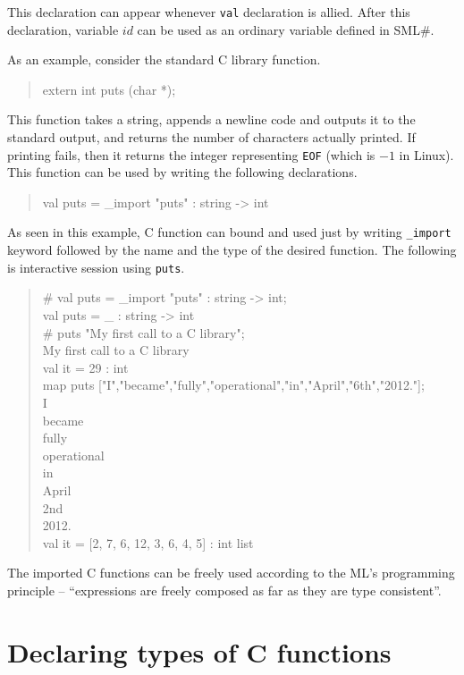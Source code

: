 \documentclass{jbook}
\newcommand{\txt}[2]{#2}
\newcommand{\smlsharp}{SML\#}
\newenvironment{program}{\begin{tt}\begin{quote}}{\end{quote}\end{tt}}
\begin{document}
	This declaration can appear whenever {\tt val} declaration is
allied.
	After this declaration, variable $id$ can be used as an ordinary
variable defined in \smlsharp{}.

	As an example, consider the standard C library function.
\begin{program}
extern int puts (char *);
\end{program}
	This function takes a string, appends a newline code and outputs
it to the standard output, and returns the number of characters actually
printed.
	If printing fails, then it returns the integer representing
{\tt EOF} (which is $-1$ in Linux).
	This function can be used by writing the following declarations.
\begin{program}
val puts = \_import "puts" : string -> int
\end{program}
	As seen in this example, C function can bound and used just by
writing {\tt \_import} keyword followed by the name and the type of the
desired function.
	The following is interactive session using {\tt puts}.
\begin{program}
\# val puts = \_import "puts" : string -> int;\\
val puts = \_ : string -> int\\
\# puts "My first call to a C library";\\
My first call to a C library\\
val it = 29 : int\\
map puts  ["I","became","fully","operational","in","April","6th","2012."];\\
I\\
became\\
fully\\
operational\\
in\\
April\\
2nd\\
2012.\\
val it = [2, 7, 6, 12, 3, 6, 4, 5] : int list
\end{program}
	The imported C functions can be freely used according to the
ML's programming principle -- ``expressions are freely
composed as far as they are type consistent''.
\fi%

\section{\txt{C関数の型}{Declaring types of C functions}}
\label{sec:extensionCtype}
\end{document}
